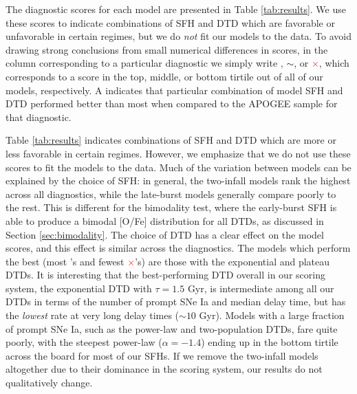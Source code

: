 \documentclass[twocolumn,twocolappendix,linenumbers,trackchanges]{aastex631}
\newcommand{\yes}{\textcolor{green}{\checkmark}\xspace}
\newcommand{\meh}{\textcolor{black}{$\sim$}\xspace}
\newcommand{\no}{\textcolor{red}{$\times$}\xspace}
\begin{document}
The diagnostic scores for each model are presented in Table \ref{tab:results}. We use these scores to indicate combinations of SFH and DTD which are favorable or unfavorable in certain regimes, but we do {\it not} fit our models to the data.
To avoid drawing strong conclusions from small numerical differences in scores, 
in the column corresponding to a particular diagnostic we simply write \yes, \meh, or \no, which corresponds to a score in the top, middle, or bottom tirtile out of all of our models, respectively. A \yes indicates that particular combination of model SFH and DTD performed better than most when compared to the APOGEE sample for that diagnostic.

Table \ref{tab:results} indicates combinations of SFH and DTD which are more or less favorable in certain regimes. However, we emphasize that we do not use these scores to fit the models to the data. Much of the variation between models can be explained by the choice of SFH: in general, the two-infall models rank the highest across all diagnostics, while the late-burst models generally compare poorly to the rest. This is different for the bimodality test, where the early-burst SFH is able to produce a bimodal [O/Fe] distribution for all DTDs, as discussed in Section \ref{sec:bimodality}. The choice of DTD has a clear effect on the model scores, and this effect is similar across the diagnostics. The models which perform the best (most \yes's and fewest \no's) are those with the exponential and plateau DTDs. It is interesting that the best-performing DTD overall in our scoring system, the exponential DTD with $\tau=1.5$ Gyr, is intermediate among all our DTDs in terms of the number of prompt SNe Ia and median delay time, but has the {\it lowest} rate at very long delay times ($\sim10$ Gyr). Models with a large fraction of prompt SNe Ia, such as the power-law and two-population DTDs, fare quite poorly, with the steepest power-law ($\alpha=-1.4$) ending up in the bottom tirtile across the board for most of our SFHs. If we remove the two-infall models altogether due to their dominance in the scoring system, our results do not qualitatively change.
\end{document}
